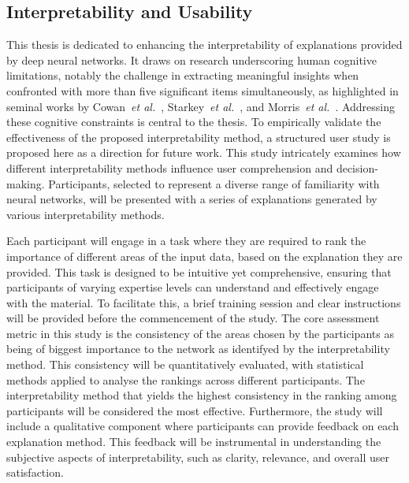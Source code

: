 \subsection{Interpretability and Usability}
This thesis is dedicated to enhancing the interpretability of explanations provided by deep neural networks. It draws on research underscoring human cognitive limitations, notably the challenge in extracting meaningful insights when confronted with more than five significant items simultaneously, as highlighted in seminal works by Cowan~\textit{et al.}~\cite{cowan2001magical}, Starkey~\textit{et al.}~\cite{starkey1995development}, and Morris~\textit{et al.}~\cite{morris2018human}. Addressing these cognitive constraints is central to the thesis. To empirically validate the effectiveness of the proposed interpretability method, a structured user study is proposed here as a direction for future work. This study intricately examines how different interpretability methods influence user comprehension and decision-making. Participants, selected to represent a diverse range of familiarity with neural networks, will be presented with a series of explanations generated by various interpretability methods.

Each participant will engage in a task where they are required to rank the importance of different areas of the input data, based on the explanation they are provided. This task is designed to be intuitive yet comprehensive, ensuring that participants of varying expertise levels can understand and effectively engage with the material. To facilitate this, a brief training session and clear instructions will be provided before the commencement of the study. The core assessment metric in this study is the consistency of the areas chosen by the participants as being of biggest importance to the network as identifyed by the interpretability method. This consistency will be quantitatively evaluated, with statistical methods applied to analyse the rankings across different participants. The interpretability method that yields the highest consistency in the ranking among participants will be considered the most effective. Furthermore, the study will include a qualitative component where participants can provide feedback on each explanation method. This feedback will be instrumental in understanding the subjective aspects of interpretability, such as clarity, relevance, and overall user satisfaction. 


